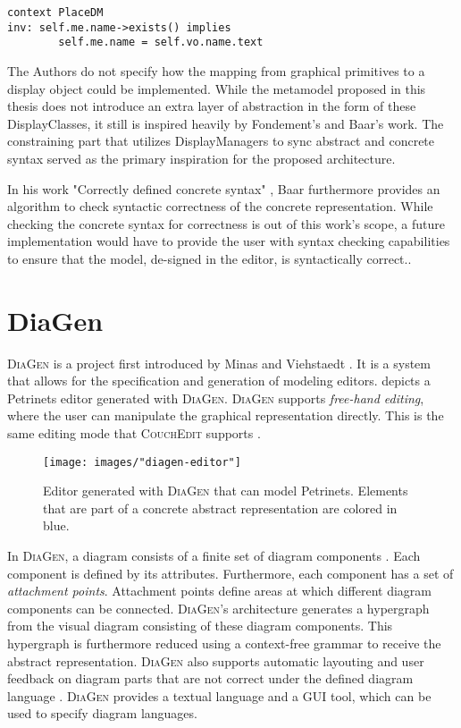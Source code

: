 \begin{lstlisting}[language=OCL,captionpos=b,caption={OCL Invariant that syncs the name attribute of place DisplayClasses and place model elements.},label={lst:ocl-inv}]
context PlaceDM
inv: self.me.name->exists() implies
        self.me.name = self.vo.name.text
\end{lstlisting}

The Authors do not specify how the mapping from graphical primitives to a display object could be implemented. While the metamodel proposed in this thesis does not introduce an extra layer of abstraction in the form of these DisplayClasses, it still is inspired heavily by Fondement's and Baar's work. The constraining part that utilizes DisplayManagers to sync abstract and concrete syntax served as the primary inspiration for the proposed architecture.

In his work "Correctly defined concrete syntax" \cite{baar_correctly_2008}, Baar furthermore provides an algorithm to check syntactic correctness of the concrete representation. While checking the concrete syntax for correctness is out of this work's scope, a future implementation would have to provide the user with syntax checking capabilities to ensure that the model, de-signed in the editor, is syntactically correct..


\section{DiaGen}
\label{sec:diagen}
\textsc{DiaGen} is a project first introduced by Minas and Viehstaedt \cite{minas_diagen_1995}. It is a system that allows for the specification and generation of modeling editors.  depicts a Petrinets editor generated with \textsc{DiaGen}. \textsc{DiaGen} supports \emph{free-hand editing}, where the user can manipulate the graphical representation directly. This is the same editing mode that \textsc{CouchEdit} supports \cite{nachreiner_couchedit_2020}.

\begin{figure}[b]
  \centering
  \texttt{[image: images/"diagen-editor"]}
  \caption{Editor generated with \textsc{DiaGen} that can model Petrinets. Elements that are part of a concrete abstract representation are colored in blue.}
  \label{fig:diagen-editor}
  \end{figure}

In \textsc{DiaGen}, a diagram consists of a finite set of diagram components \cite{minas_concepts_2002}. Each component is defined by its attributes. Furthermore, each component has a set of \emph{attachment points}. Attachment points define areas at which different diagram components can be connected. \textsc{DiaGen}'s architecture generates a hypergraph from the visual diagram consisting of these diagram components. This hypergraph is furthermore reduced using a context-free grammar to receive the abstract representation. \textsc{DiaGen} also supports automatic layouting and user feedback on diagram parts that are not correct under the defined diagram language \cite{minas_concepts_2002}. \textsc{DiaGen} provides a textual language and a GUI tool, which can be used to specify diagram languages. 

